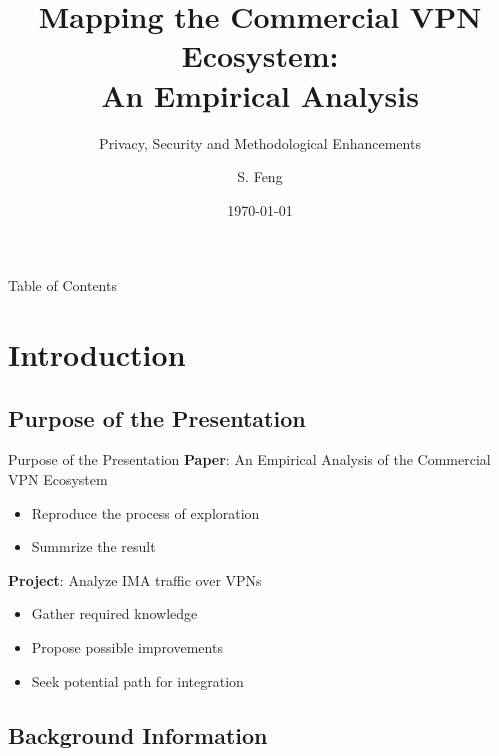 \documentclass{beamer}
\title[Mapping the Commercial VPN Ecosystem]{
    Mapping the Commercial VPN Ecosystem:\\
    An Empirical Analysis
}
\subtitle[]{Privacy, Security and Methodological Enhancements}
\author[Shuo Feng]{S. Feng}
\institute[NIMS Lab]{
  NIMS Lab\\
  USRA Summer 2023}
\date{\today}
\begin{document}
\frame{\titlepage}


\begin{frame}{Table of Contents}
  \tableofcontents
\end{frame}

\section{Introduction}

\subsection{Purpose of the Presentation}

\begin{frame}{Purpose of the Presentation}
  \textbf{Paper}: An Empirical Analysis of the Commercial VPN Ecosystem
  \begin{itemize}
    \item Reproduce the process of exploration
    \item Summrize the result
  \end{itemize}

  \textbf{Project}: Analyze IMA traffic over \colorbox{DALYellow}{VPNs}
  \begin{itemize}
    \item Gather required knowledge
    \item Propose possible improvements
    \item Seek potential path for integration
  \end{itemize}
\end{frame}

\subsection{Background Information}
\end{document}

